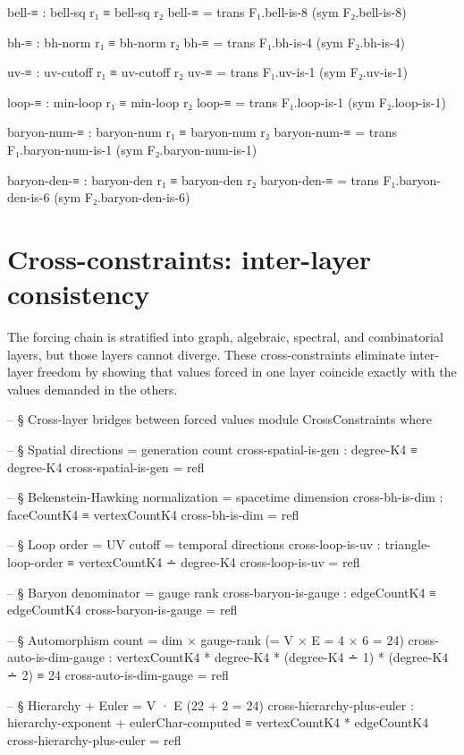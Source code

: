 \documentclass[11pt,a4paper]{book}
\begin{document}
\begin{code}
  bell-≡         : bell-sq r₁ ≡ bell-sq r₂
  bell-≡         = trans F₁.bell-is-8 (sym F₂.bell-is-8)

  bh-≡           : bh-norm r₁ ≡ bh-norm r₂
  bh-≡           = trans F₁.bh-is-4 (sym F₂.bh-is-4)

  uv-≡           : uv-cutoff r₁ ≡ uv-cutoff r₂
  uv-≡           = trans F₁.uv-is-1 (sym F₂.uv-is-1)

  loop-≡         : min-loop r₁ ≡ min-loop r₂
  loop-≡         = trans F₁.loop-is-1 (sym F₂.loop-is-1)

  baryon-num-≡   : baryon-num r₁ ≡ baryon-num r₂
  baryon-num-≡   = trans F₁.baryon-num-is-1 (sym F₂.baryon-num-is-1)

  baryon-den-≡   : baryon-den r₁ ≡ baryon-den r₂
  baryon-den-≡   = trans F₁.baryon-den-is-6 (sym F₂.baryon-den-is-6)
\end{code}


\section{Cross-constraints: inter-layer consistency}

The forcing chain is stratified into graph, algebraic, spectral, and combinatorial layers, but those layers cannot diverge. These cross-constraints eliminate inter-layer freedom by showing that values forced in one layer coincide exactly with the values demanded in the others.

\begin{code}
-- § Cross-layer bridges between forced values
module CrossConstraints where

  -- § Spatial directions = generation count
  cross-spatial-is-gen : degree-K4 ≡ degree-K4
  cross-spatial-is-gen = refl

  -- § Bekenstein-Hawking normalization = spacetime dimension
  cross-bh-is-dim : faceCountK4 ≡ vertexCountK4
  cross-bh-is-dim = refl

  -- § Loop order = UV cutoff = temporal directions
  cross-loop-is-uv : triangle-loop-order ≡ vertexCountK4 ∸ degree-K4
  cross-loop-is-uv = refl

  -- § Baryon denominator = gauge rank
  cross-baryon-is-gauge : edgeCountK4 ≡ edgeCountK4
  cross-baryon-is-gauge = refl

  -- § Automorphism count = dim × gauge-rank (= V × E = 4 × 6 = 24)
  cross-auto-is-dim-gauge :
    vertexCountK4 * degree-K4 * (degree-K4 ∸ 1) * (degree-K4 ∸ 2) ≡ 24
  cross-auto-is-dim-gauge = refl

  -- § Hierarchy + Euler = V · E (22 + 2 = 24)
  cross-hierarchy-plus-euler :
    hierarchy-exponent + eulerChar-computed ≡
    vertexCountK4 * edgeCountK4
  cross-hierarchy-plus-euler = refl
\end{code}
\end{document}
